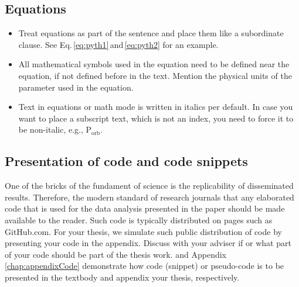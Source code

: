 \subsection*{Equations}
\begin{itemize}
    \item Treat equations as part of the sentence and place them like a subordinate clause. See Eq.\,\ref{eq:pyth1}\,and\,\ref{eq:pyth2} for an example.

    \item All mathematical symbols used in the equation need to be defined near the equation, if not defined before in the text. Mention the physical units of the parameter used in the equation.
    
    \item Text in equations or math mode is written in italics per default. In case you want to place a subscript text, which is not an index, you need to force it to be non-italic, e.g., P$_{\mathrm{orb}}$.
    
    
\end{itemize}


\subsection*{Presentation of code and code snippets}

One of the bricks of the fundament of science is the replicability of disseminated results. Therefore, the modern standard of research journals that any elaborated code that is used for the data analysis presented in the paper should be made available to the reader. Such code is typically distributed on pages such as GitHub.com. 
For your thesis, we simulate such public distribution of code by presenting your code in the appendix. Discuss with your adviser if or what part of your code should be part of the thesis work.  and Appendix\,\ref{chap:appendixCode} demonstrate how code (snippet) or pseudo-code is to be presented in the textbody and appendix your thesis, respectively.

